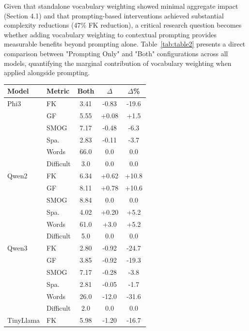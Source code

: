 \documentclass[10pt, a4paper]{article}
\begin{document}
Given that standalone vocabulary weighting showed minimal aggregate impact (Section 4.1) and that prompting-based interventions achieved substantial complexity reductions (47\% FK reduction), a critical research question becomes whether adding vocabulary weighting to contextual prompting provides measurable benefits beyond prompting alone. Table~\ref{tab:table2} presents a direct comparison between "Prompting Only" and "Both" configurations across all models, quantifying the marginal contribution of vocabulary weighting when applied alongside prompting.

\begin{table}[!ht]
\begin{center}
\begin{tabular}{llccc}
\hline
\textbf{Model} & \textbf{Metric} & \textbf{Both} & \textbf{$\Delta$} & \textbf{$\Delta$\%} \\
\hline
Phi3      & FK          & 3.41 & -0.83 & -19.6  \\
          & GF          & 5.55 & +0.08 & +1.5  \\
          & SMOG        & 7.17 & -0.48 & -6.3  \\
          & Spa.        & 2.83 & -0.11 & -3.7  \\
          & Words       & 66.0 & 0.0  & 0.0  \\
          & Difficult & 3.0  & 0.0  & 0.0  \\
\hline
Qwen2     & FK          & 6.34  & +0.62 & +10.8 \\
          & GF          & 8.11 & +0.78 & +10.6 \\
          & SMOG        & 8.84  & 0.0 & 0.0  \\
          & Spa.        & 4.02  & +0.20 & +5.2 \\
          & Words       & 61.0  & +3.0  & +5.2 \\
          & Difficult & 5.0   & 0.0  & 0.0 \\
\hline
Qwen3     & FK          & 2.80 & -0.92 & -24.7  \\
          & GF          & 3.85 & -0.92 & -19.3  \\
          & SMOG        & 7.17 & -0.28 & -3.8  \\
          & Spa.        & 2.81 & -0.05 & -1.7  \\
          & Words       & 26.0 & -12.0  & -31.6 \\
          & Difficult & 2.0  & 0.0  & 0.0  \\
\hline
TinyLlama & FK          & 5.98  & -1.20 & -16.7 \\

\end{tabular}
\end{center}
\end{table}
\end{document}

